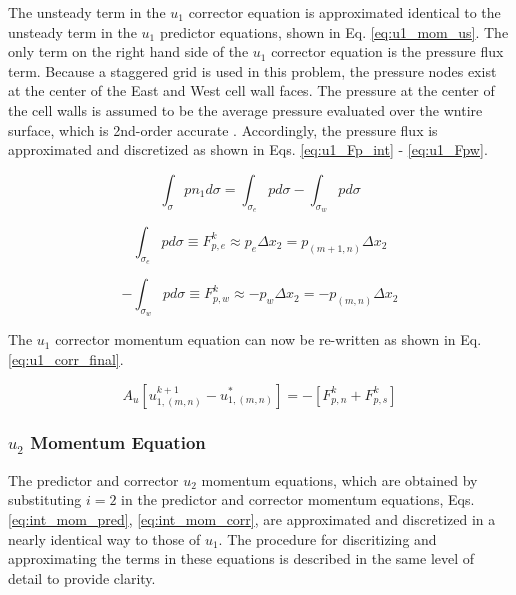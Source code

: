 \documentclass[10pt, letterpaper]{article}
\begin{document}
The unsteady term in the $u_{1}$ corrector equation is approximated identical to the unsteady term in the $u_{1}$ predictor equations, shown in Eq. \ref{eq:u1_mom_us}. The only term on the right hand side of the $u_{1}$ corrector equation is the pressure flux term. Because a staggered grid is used in this problem, the pressure nodes exist at the center of the East and West cell wall faces. The pressure at the center of the cell walls is assumed to be the average pressure evaluated over the wntire surface, which is 2nd-order accurate \cite{Ferziger_Springer_2002}. Accordingly, the pressure flux is approximated and discretized as shown in Eqs. \ref{eq:u1_Fp_int} - \ref{eq:u1_Fpw}.

\begin{equation}
  \int_{\sigma}pn_{1}d\sigma = \int_{\sigma_{e}}pd\sigma - \int_{\sigma_{w}}pd\sigma
  \label{eq:u1_Fp_int}
\end{equation}

\begin{equation}
  \int_{\sigma_{e}}pd\sigma \equiv F_{p,e}^{k} \approx p_{e}\Delta{x_{2}} = p_{(m+1,n)}\Delta{x_{2}}
  \label{eq:u1_Fpe}
\end{equation}

\begin{equation}
  - \int_{\sigma_{w}}pd\sigma \equiv F_{p,w}^{k} \approx - p_{w}\Delta{x_{2}} = - p_{(m,n)}\Delta{x_{2}}
  \label{eq:u1_Fpw}
\end{equation}

The $u_{1}$ corrector momentum equation can now be re-written as shown in Eq. \ref{eq:u1_corr_final}.

\begin{equation}
  \boxed{
  A_{u}[u_{1,(m,n)}^{k+1}-u_{1,(m,n)}^{*}] = - [F_{p,n}^{k} + F_{p,s}^{k}]
  }
  \label{eq:u1_corr_final}
\end{equation}


\subsubsection{$u_{2}$ Momentum Equation}

The predictor and corrector $u_{2}$ momentum equations, which are obtained by substituting $i = 2$ in the predictor and corrector momentum equations, Eqs. \ref{eq:int_mom_pred}, \ref {eq:int_mom_corr},  are approximated and discretized in a nearly identical way to those of $u_{1}$. The procedure for discritizing and approximating the terms in these equations is described in the same level of detail to provide clarity.
\end{document}
